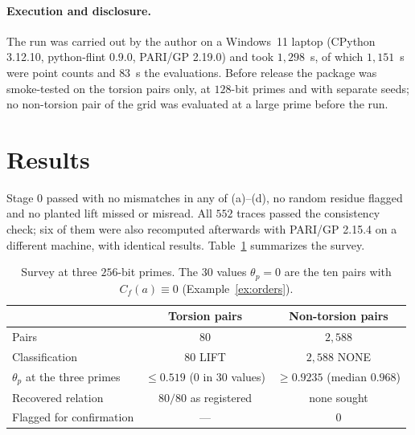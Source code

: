 \documentclass[11pt,a4paper]{article}
\numberwithin{equation}{section}
\theoremstyle{plain}
\theoremstyle{definition}
\begin{document}
\paragraph{Execution and disclosure.} The run was carried out by the author on a Windows~11 laptop (CPython 3.12.10, python-flint 0.9.0, PARI/GP 2.19.0) and took $1{,}298$~s, of which $1{,}151$~s were point counts and $83$~s the evaluations. Before release the package was smoke-tested on the torsion pairs only, at $128$-bit primes and with separate seeds; no non-torsion pair of the grid was evaluated at a large prime before the run.

\section{Results}\label{sec:results}

Stage 0 passed with no mismatches in any of (a)--(d), no random residue flagged and no planted lift missed or misread. All $552$ traces passed the consistency check; six of them were also recomputed afterwards with PARI/GP 2.15.4 on a different machine, with identical results. Table~\ref{tab:summary} summarizes the survey.

\begin{table}[ht]
\centering
\begin{tabular}{lcc}
\toprule
 & Torsion pairs & Non-torsion pairs\\
\midrule
Pairs & $80$ & $2{,}588$\\
Classification & $80$ LIFT & $2{,}588$ NONE\\
$\theta_p$ at the three primes & $\le0.519$ ($0$ in $30$ values) & $\ge0.9235$ (median $0.968$)\\
Recovered relation & $80/80$ as registered & none sought\\
Flagged for confirmation & --- & $0$\\
\bottomrule
\end{tabular}
\caption{Survey at three $256$-bit primes. The $30$ values $\theta_p=0$ are the ten pairs with $C_f(a)\equiv0$ (Example~\ref{ex:orders}).}\label{tab:summary}
\end{table}
\end{document}
